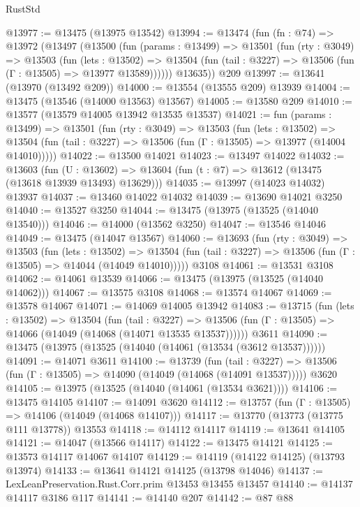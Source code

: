 \begin{lexlean}{RustStd}
\begin{coremodule}
{\begin{coremodule}
{{{{{{{{{{{{{{{{{{{{{{{{{{{{{{{{{{{{{@13977 := @13475 (@13975 @13542)
@13994 := @13474
    (fun (fn : @74) =>
    @13972
      (@13497
        (@13500
          (fun (params : @13499) =>
          @13501
            (fun (rty : @3049) =>
            @13503
              (fun (lets : @13502) =>
              @13504 (fun (tail : @3227) => @13506 (fun (Γ : @13505) => @13977 @13589))))))
        @13635))
    @209
@13997 := @13641 (@13970 (@13492 @209))
@14000 := @13554 (@13555 @209) @13939
@14004 := @13475 (@13546 (@14000 @13563) @13567)
@14005 := @13580 @209
@14010 := @13577 (@13579 @14005 @13942 @13535 @13537)
@14021 := fun (params : @13499) =>
  @13501
    (fun (rty : @3049) =>
    @13503
      (fun (lets : @13502) =>
      @13504 (fun (tail : @3227) => @13506 (fun (Γ : @13505) => @13977 (@14004 @14010)))))
@14022 := @13500 @14021
@14023 := @13497 @14022
@14032 := @13603
    (fun (U : @13602) => @13604 (fun (t : @7) => @13612 (@13475 (@13618 @13939 @13493) @13629)))
@14035 := @13997 (@14023 @14032) @13937
@14037 := @13460 @14022 @14032
@14039 := @13690 @14021 @3250
@14040 := @13527 @3250
@14044 := @13475 (@13975 (@13525 (@14040 @13540)))
@14046 := @14000 (@13562 @3250)
@14047 := @13546 @14046
@14049 := @13475 (@14047 @13567)
@14060 := @13693
    (fun (rty : @3049) =>
    @13503
      (fun (lets : @13502) =>
      @13504 (fun (tail : @3227) => @13506 (fun (Γ : @13505) => @14044 (@14049 @14010)))))
    @3108
@14061 := @13531 @3108
@14062 := @14061 @13539
@14066 := @13475 (@13975 (@13525 (@14040 @14062)))
@14067 := @13575 @3108
@14068 := @13574 @14067
@14069 := @13578 @14067
@14071 := @14069 @14005 @13942
@14083 := @13715
    (fun (lets : @13502) =>
    @13504
      (fun (tail : @3227) =>
      @13506 (fun (Γ : @13505) => @14066 (@14049 (@14068 (@14071 @13535 @13537))))))
    @3611
@14090 := @13475 (@13975 (@13525 (@14040 (@14061 (@13534 (@3612 @13537))))))
@14091 := @14071 @3611
@14100 := @13739
    (fun (tail : @3227) => @13506 (fun (Γ : @13505) => @14090 (@14049 (@14068 (@14091 @13537)))))
    @3620
@14105 := @13975 (@13525 (@14040 (@14061 (@13534 @3621))))
@14106 := @13475 @14105
@14107 := @14091 @3620
@14112 := @13757 (fun (Γ : @13505) => @14106 (@14049 (@14068 @14107)))
@14117 := @13770 (@13773 (@13775 @111 @13778)) @13553
@14118 := @14112 @14117
@14119 := @13641 @14105
@14121 := @14047 (@13566 @14117)
@14122 := @13475 @14121
@14125 := @13573 @14117 @14067 @14107
@14129 := @14119 (@14122 @14125) (@13793 @13974)
@14133 := @13641 @14121 @14125 (@13798 @14046)
@14137 := LexLeanPreservation.Rust.Corr.prim @13453 @13455 @13457
@14140 := @14137 @14117 @3186 @117
@14141 := @14140 @207
@14142 := @87 @88
}}}}}}}}}}}}}}}}}}}}}}}}}}}}}}}}}}}}}
\end{coremodule}}
\end{coremodule}
\end{lexlean}
